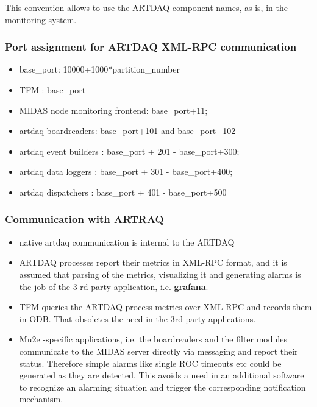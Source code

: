 This convention allows to use the ARTDAQ component names, as is, in the monitoring system.

\subsubsection{Port assignment for ARTDAQ XML-RPC communication}
\begin{itemize}
\item
  base\_port: 10000+1000*partition\_number
\item 
  TFM : base\_port
\item 
  MIDAS node monitoring frontend: base\_port+11;
\item 
  artdaq boardreaders: base\_port+101 and base\_port+102
\item 
  artdaq event builders : base\_port + 201 - base\_port+300;
\item 
  artdaq data loggers  : base\_port + 301 - base\_port+400;
\item 
  artdaq dispatchers : base\_port + 401 - base\_port+500
\end{itemize}


\subsubsection{Communication with ARTRAQ}

\begin{itemize}
\item
  native artdaq communication is internal to the ARTDAQ
\item
  ARTDAQ processes report their metrics in XML-RPC format,
  and it is assumed that parsing of the metrics, visualizing
  it and generating alarms is the job of the 3-rd party application,
  i.e. {\bf grafana}.
\item
  TFM queries the ARTDAQ process metrics over XML-RPC and records
  them in ODB. That obsoletes the need in the 3rd party applications.
\item
  Mu2e -specific applications, i.e. the boardreaders and the filter modules 
  communicate to the MIDAS server directly via messaging and report 
  their status. Therefore simple alarms like single ROC timeouts etc
  could be generated as they are detected. 
  This avoids a need in an additional software to recognize an alarming
  situation and trigger the corresponding notification mechanism.
\end{itemize}


